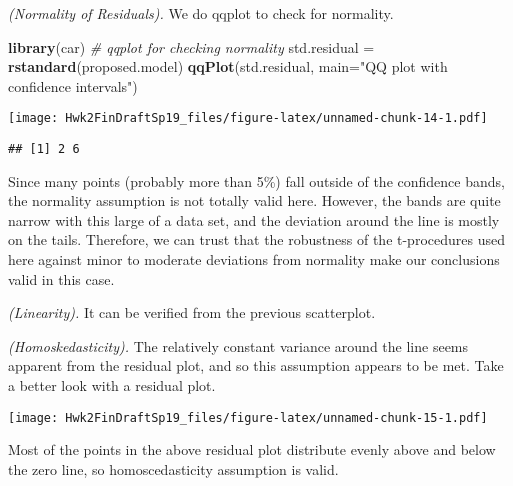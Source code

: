 \documentclass[12pt,]{article}
\newenvironment{Shaded}{\begin{snugshade}}{\end{snugshade}}
\newcommand{\KeywordTok}[1]{\textcolor[rgb]{0.13,0.29,0.53}{\textbf{#1}}}
\newcommand{\DataTypeTok}[1]{\textcolor[rgb]{0.13,0.29,0.53}{#1}}
\newcommand{\DecValTok}[1]{\textcolor[rgb]{0.00,0.00,0.81}{#1}}
\newcommand{\StringTok}[1]{\textcolor[rgb]{0.31,0.60,0.02}{#1}}
\newcommand{\CommentTok}[1]{\textcolor[rgb]{0.56,0.35,0.01}{\textit{#1}}}
\newcommand{\OperatorTok}[1]{\textcolor[rgb]{0.81,0.36,0.00}{\textbf{#1}}}
\newcommand{\NormalTok}[1]{#1}
\begin{document}
\emph{(Normality of Residuals).} We do qqplot to check for normality.

\begin{Shaded}
\begin{Highlighting}[]
\KeywordTok{library}\NormalTok{(car)}
\CommentTok{# qqplot for checking normality}
\NormalTok{std.residual =}\StringTok{ }\KeywordTok{rstandard}\NormalTok{(proposed.model)}
\KeywordTok{qqPlot}\NormalTok{(std.residual, }\DataTypeTok{main=}\StringTok{"QQ plot with confidence intervals"}\NormalTok{)}
\end{Highlighting}
\end{Shaded}

\texttt{[image: Hwk2FinDraftSp19\_files/figure-latex/unnamed-chunk-14-1.pdf]}

\begin{verbatim}
## [1] 2 6
\end{verbatim}

Since many points (probably more than 5\%) fall outside of the
confidence bands, the normality assumption is not totally valid here.
However, the bands are quite narrow with this large of a data set, and
the deviation around the line is mostly on the tails. Therefore, we can
trust that the robustness of the t-procedures used here against minor to
moderate deviations from normality make our conclusions valid in this
case.

\emph{(Linearity).} It can be verified from the previous scatterplot.

\emph{(Homoskedasticity).} The relatively constant variance around the
line seems apparent from the residual plot, and so this assumption
appears to be met. Take a better look with a residual plot.

\begin{Shaded}
\end{Shaded}

\texttt{[image: Hwk2FinDraftSp19\_files/figure-latex/unnamed-chunk-15-1.pdf]}

Most of the points in the above residual plot distribute evenly above
and below the zero line, so homoscedasticity assumption is valid.
\end{document}
